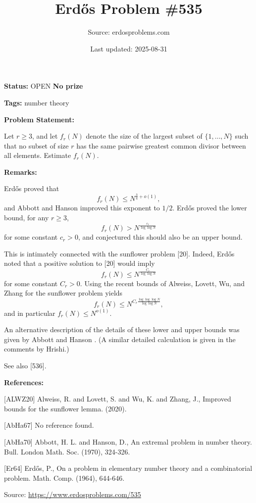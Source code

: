\documentclass{article}
\title{Erd\H{o}s Problem \#535}
\date{Last updated: 2025-08-31}
\author{Source: erdosproblems.com}
\begin{document}
\maketitle

\noindent\textbf{Status:} OPEN \quad \textbf{No prize}

\noindent\textbf{Tags:} number theory

\medskip
\noindent\textbf{Problem Statement:}

Let $r\geq 3$, and let $f_r(N)$ denote the size of the largest subset of $\{1,\ldots,N\}$ such that no subset of size $r$ has the same pairwise greatest common divisor between all elements. Estimate $f_r(N)$.

\bigskip
\noindent\textbf{Remarks:}

Erd\H{o}s \cite{Er64} proved that\[f_r(N) \leq N^{\frac{3}{4}+o(1)},\]and Abbott and Hanson \cite{AbHa70} improved this exponent to $1/2$. Erd\H{o}s \cite{Er64} proved the lower bound, for any $r \geq 3$,\[f_r(N) > N^{\frac{c_r}{\log\log N}}\]for some constant $c_r>0$, and conjectured this should also be an upper bound. 

This is intimately connected with the sunflower problem [20]. Indeed, Erd\H{o}s \cite{Er64} noted that a positive solution to [20] would imply\[f_r(N) \leq N^{\frac{C_r}{\log\log N}}\]for some constant $C_r>0$. Using the recent bounds of Alweiss, Lovett, Wu, and Zhang \cite{ALWZ20} for the sunflower problem yields\[f_r(N) \leq N^{C_r\frac{\log\log\log N}{\log\log N}},\]and in particular $f_r(N) \leq N^{o(1)}$. 

An alternative description of the details of these lower and upper bounds was given by Abbott and Hanson \cite{AbHa67}. (A similar detailed calculation is given in the comments by Hrishi.)

See also [536].

\bigskip
\noindent\textbf{References:}

[ALWZ20] Alweiss, R. and Lovett, S. and Wu, K. and Zhang, J., Improved bounds for the sunflower lemma. (2020).
 
 [AbHa67] No reference found.

 [AbHa70] Abbott, H. L. and Hanson, D., An extremal problem in number theory. Bull. London Math. Soc. (1970), 324-326.
 
 [Er64] Erd\H{o}s, P., On a problem in elementary number theory and a combinatorial problem. Math. Comp. (1964), 644-646.

\bigskip
\noindent\small{Source: \url{https://www.erdosproblems.com/535}}
\end{document}
